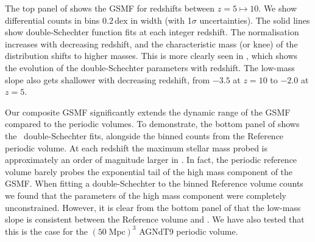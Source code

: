 The top panel of  shows the GSMF for redshifts between $z = 5 \mapsto 10$.
We show differential counts in bins $0.2 \, \mathrm{dex}$ in width (with 1$\sigma$ uncertainties).
The solid lines show double-Schechter function fits at each integer redshift.
The normalisation increases with decreasing redshift, and the characteristic mass (or knee) of the distribution shifts to higher masses.
This is more clearly seen in , which shows the evolution of the double-Schechter parameters with redshift.
The low-mass slope also gets shallower with decreasing redshift, from $-3.5$ at $z = 10$ to $-2.0$ at $z = 5$.




Our composite GSMF significantly extends the dynamic range of the GSMF compared to the periodic volumes.
To demonstrate, the bottom panel of  shows the \flares\ double-Schechter fits, alongside the binned counts from the Reference periodic volume.
At each redshift the maximum stellar mass probed is approximately an order of magnitude larger in \flares.
In fact, the periodic reference volume barely probes the exponential tail of the high mass component of the GSMF.
When fitting a double-Schechter to the binned Reference volume counts we found that the parameters of the high mass component were completely unconstrained.
However, it is clear from the bottom panel of  that the low-mass slope is consistent between the Reference volume and \flares.
We have also tested that this is the case for the $(50 \; \mathrm{Mpc})^{3}$ AGNdT9 periodic volume.


